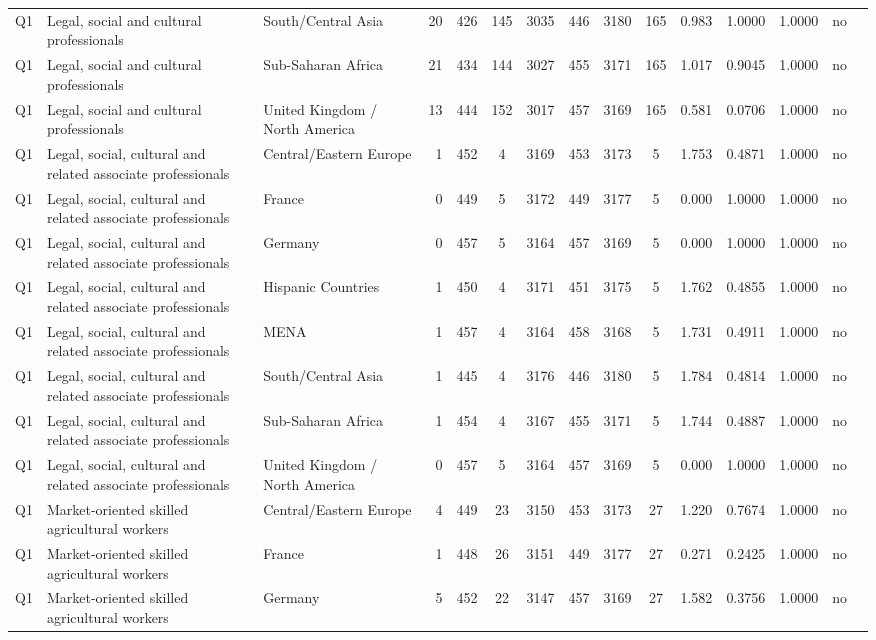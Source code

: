 \begin{longtable}{lllrcccccccccll}
Q1 & Legal, social and cultural professionals & South/Central Asia & 20 & 426 & 145 & 3035 & 446 & 3180 & 165 & 0.983 & 1.0000 & 1.0000 & no \\
Q1 & Legal, social and cultural professionals & Sub-Saharan Africa & 21 & 434 & 144 & 3027 & 455 & 3171 & 165 & 1.017 & 0.9045 & 1.0000 & no \\
Q1 & Legal, social and cultural professionals & United Kingdom / North America & 13 & 444 & 152 & 3017 & 457 & 3169 & 165 & 0.581 & 0.0706 & 1.0000 & no \\
Q1 & Legal, social, cultural and related associate professionals & Central/Eastern Europe & 1 & 452 & 4 & 3169 & 453 & 3173 & 5 & 1.753 & 0.4871 & 1.0000 & no \\
Q1 & Legal, social, cultural and related associate professionals & France & 0 & 449 & 5 & 3172 & 449 & 3177 & 5 & 0.000 & 1.0000 & 1.0000 & no \\
Q1 & Legal, social, cultural and related associate professionals & Germany & 0 & 457 & 5 & 3164 & 457 & 3169 & 5 & 0.000 & 1.0000 & 1.0000 & no \\
Q1 & Legal, social, cultural and related associate professionals & Hispanic Countries & 1 & 450 & 4 & 3171 & 451 & 3175 & 5 & 1.762 & 0.4855 & 1.0000 & no \\
Q1 & Legal, social, cultural and related associate professionals & MENA & 1 & 457 & 4 & 3164 & 458 & 3168 & 5 & 1.731 & 0.4911 & 1.0000 & no \\
Q1 & Legal, social, cultural and related associate professionals & South/Central Asia & 1 & 445 & 4 & 3176 & 446 & 3180 & 5 & 1.784 & 0.4814 & 1.0000 & no \\
Q1 & Legal, social, cultural and related associate professionals & Sub-Saharan Africa & 1 & 454 & 4 & 3167 & 455 & 3171 & 5 & 1.744 & 0.4887 & 1.0000 & no \\
Q1 & Legal, social, cultural and related associate professionals & United Kingdom / North America & 0 & 457 & 5 & 3164 & 457 & 3169 & 5 & 0.000 & 1.0000 & 1.0000 & no \\
Q1 & Market-oriented skilled agricultural workers & Central/Eastern Europe & 4 & 449 & 23 & 3150 & 453 & 3173 & 27 & 1.220 & 0.7674 & 1.0000 & no \\
Q1 & Market-oriented skilled agricultural workers & France & 1 & 448 & 26 & 3151 & 449 & 3177 & 27 & 0.271 & 0.2425 & 1.0000 & no \\
Q1 & Market-oriented skilled agricultural workers & Germany & 5 & 452 & 22 & 3147 & 457 & 3169 & 27 & 1.582 & 0.3756 & 1.0000 & no \\

\end{longtable}
